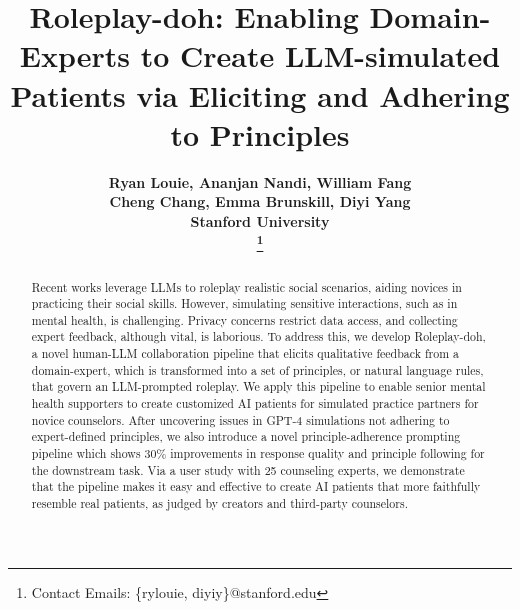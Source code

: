 \documentclass[11pt]{article}
\title{Roleplay-doh: Enabling Domain-Experts to Create LLM-simulated\\ Patients via Eliciting and Adhering to Principles}
\author{\bf \hypersetup{linkcolor=black}
Ryan Louie, Ananjan Nandi, William Fang \\
\bf \hypersetup{linkcolor=black}
Cheng Chang, Emma Brunskill, Diyi Yang \\
Stanford University\\ 
\thanks{Contact Emails: \{rylouie, diyiy\}@stanford.edu}
        }
\begin{document}
\maketitle
\begin{abstract}
Recent works leverage LLMs to roleplay realistic social scenarios, aiding novices in practicing their social skills. However, simulating sensitive interactions, such as in mental health, is challenging. Privacy concerns restrict data access, and collecting expert feedback, although vital, is laborious.
To address this, we develop Roleplay-doh, a novel human-LLM collaboration pipeline that elicits qualitative feedback from a domain-expert, which is transformed into a set of principles, or natural language rules, that govern an LLM-prompted roleplay. 
We apply this pipeline to enable senior mental health supporters to create customized AI patients for simulated practice partners for novice counselors. After uncovering issues in GPT-4 simulations not adhering to expert-defined principles, we also introduce a novel principle-adherence prompting pipeline which shows 30\% improvements in response quality and principle following for the downstream task.  Via a user study with 25 counseling experts, we demonstrate that the pipeline makes it easy and effective to create AI patients that more faithfully resemble real patients, as judged by creators and third-party counselors.


\end{abstract}
\end{document}
